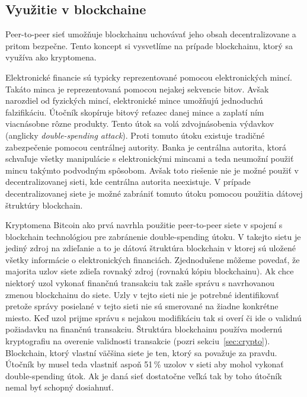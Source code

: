 \subsection{Využitie v blockchaine}

Peer-to-peer sieť umožňuje blockchainu uchovávať jeho obsah decentralizovane a pritom bezpečne. Tento koncept si vysvetlíme na prípade blockchainu, ktorý sa využíva ako kryptomena.

Elektronické financie sú typicky reprezentované pomocou elektronických mincí. Takáto minca je reprezentovaná pomocou nejakej sekvencie bitov. Avšak narozdiel od fyzických mincí, elektronické mince umožňujú jednoduchú falzifikáciu. Útočník skopíruje bitový reťazec danej mince a zaplatí ním viacnásobne rôzne produkty. Tento útok sa volá zdvojnásobenia výdavkov (anglicky \textit{double-spending attack}). Proti tomuto útoku existuje tradičné zabezpečenie pomocou centrálnej autority. Banka je centrálna autorita, ktorá schvaľuje všetky manipulácie s elektronickými mincami a teda neumožní použiť mincu takýmto podvodným spôsobom. Avšak toto riešenie nie je možné použiť v decentralizovanej sieti, kde centrálna autorita neexistuje. V prípade decentralizovanej siete je možné zabrániť tomuto útoku pomocou použitia dátovej štruktúry blockchain.~\cite{doubleSpending}

Kryptomena Bitcoin ako prvá navrhla použitie peer-to-peer siete v spojení s blockchain technológiou pre zabránenie double-spending útoku. V takejto sietu je jediný zdroj na zdieľanie a to je dátová štruktúra blockchain v ktorej sú uložené všetky informácie o elektronických financiách. Zjednodušene môžeme povedať, že majorita uzlov siete zdieľa rovnaký zdroj (rovnakú kópiu blockchainu). Ak chce niektorý uzol vykonať finančnú transakciu tak zašle správu s navrhovanou zmenou blockchainu do siete. Uzly v tejto sieti nie je potrebné identifikovať pretože správy posielané v tejto sieti nie sú smerované na žiadne konkrétne miesto. Keď uzol prijme správu s nejakou modifikáciu tak si overí či ide o validnú požiadavku na finančnú transakciu. Štruktúra blockchainu používa modernú kryptografiu na overenie validnosti transakcie (pozri sekciu~\ref{sec:crypto}). Blockchain, ktorý vlastní väčšina siete je ten, ktorý sa považuje za pravdu. Útočník by musel teda vlastniť aspoň 51\,\% uzolov v sieti aby mohol vykonať double-spending útok. Ak je daná sieť dostatočne veľká tak by toho útočník nemal byť schopný dosiahnuť.~\cite{satoshiBitcoin}

